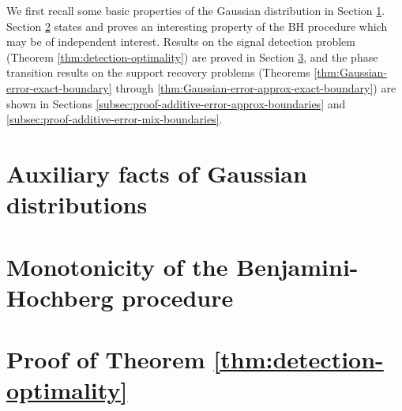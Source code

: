 
We first recall some basic properties of the Gaussian distribution in Section \ref{sec:Gaussian-distributions}.
Section \ref{suppsec:BH-monotonicity} states and proves an interesting property of the \ac{BH} procedure which may be of independent interest.
Results on the signal detection problem (Theorem \ref{thm:detection-optimality}) are proved in Section \ref{subsec:proof-additive-error-detection-boundaries}, and the phase transition results on the support recovery problems (Theorems \ref{thm:Gaussian-error-exact-boundary} through \ref{thm:Gaussian-error-approx-exact-boundary}) are shown in Sections \ref{subsec:proof-additive-error-approx-boundaries} and \ref{subsec:proof-additive-error-mix-boundaries}.


\section{Auxiliary facts of Gaussian distributions}
\label{sec:Gaussian-distributions}


\section{Monotonicity of the Benjamini-Hochberg procedure}
\label{suppsec:BH-monotonicity}


\section{Proof of Theorem \ref{thm:detection-optimality}}
\label{subsec:proof-additive-error-detection-boundaries}

